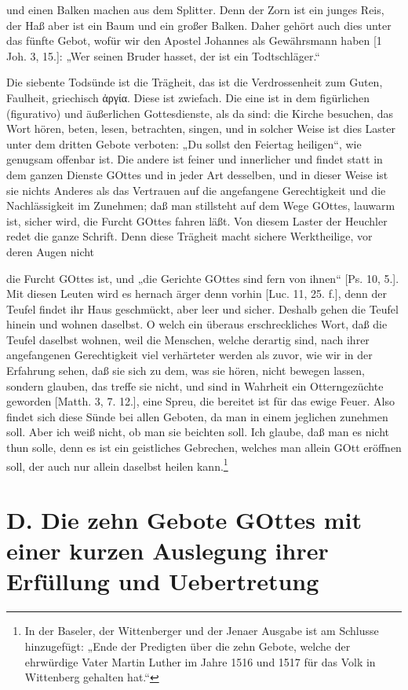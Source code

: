 und einen Balken machen aus dem Splitter. Denn der Zorn ist ein junges Reis, der Haß aber ist ein Baum und ein großer Balken. Daher gehört auch dies unter das fünfte Gebot, wofür wir den Apostel Johannes als Gewährsmann haben [1 Joh. 3, 15.]: „Wer seinen Bruder hasset, der ist ein Todtschläger.“

Die siebente Todsünde ist die Trägheit, das ist die Verdrossenheit zum Guten, Faulheit, griechisch ἀργία. Diese ist zwiefach. Die eine ist in dem figürlichen (figurativo) und äußerlichen Gottesdienste, als da sind: die Kirche besuchen, das Wort hören, beten, lesen, betrachten, singen, und in solcher Weise ist dies Laster unter dem dritten Gebote verboten: „Du sollst den Feiertag heiligen“, wie genugsam offenbar ist. Die andere ist feiner und innerlicher und findet statt in dem ganzen Dienste GOttes und in jeder Art desselben, und in dieser Weise ist sie nichts Anderes als das Vertrauen auf die angefangene Gerechtigkeit und die Nachlässigkeit im Zunehmen; daß man stillsteht auf dem Wege GOttes, lauwarm ist, sicher wird, die Furcht GOttes fahren läßt. Von diesem Laster der Heuchler redet die ganze Schrift. Denn diese Trägheit macht sichere Werktheilige, vor deren Augen nicht

die Furcht GOttes ist, und „die Gerichte GOttes sind fern von ihnen“ [Ps. 10, 5.]. Mit diesen Leuten wird es hernach ärger denn vorhin [Luc. 11, 25. f.], denn der Teufel findet ihr Haus geschmückt, aber leer und sicher. Deshalb gehen die Teufel hinein und wohnen daselbst. O welch ein überaus erschreckliches Wort, daß die Teufel daselbst wohnen, weil die Menschen, welche derartig sind, nach ihrer angefangenen Gerechtigkeit viel verhärteter werden als zuvor, wie wir in der Erfahrung sehen, daß sie sich zu dem, was sie hören, nicht bewegen lassen, sondern glauben, das treffe sie nicht, und sind in Wahrheit ein Otterngezüchte geworden [Matth. 3, 7. 12.], eine Spreu, die bereitet ist für das ewige Feuer. Also findet sich diese Sünde bei allen Geboten, da man in einem jeglichen zunehmen soll. Aber ich weiß nicht, ob man sie beichten soll. Ich glaube, daß man es nicht thun solle, denn es ist ein geistliches Gebrechen, welches man allein GOtt eröffnen soll, der auch nur allein daselbst heilen kann.\footnote{In der Baseler, der Wittenberger und der Jenaer Ausgabe ist am Schlusse hinzugefügt: „Ende der Predigten über die zehn Gebote, welche der ehrwürdige Vater Martin Luther im Jahre 1516 und 1517 für das Volk in Wittenberg gehalten hat.“}

\chapter[D. Die zehn Gebote GOttes mit einer kurzen Auslegung]{D. Die zehn Gebote GOttes mit einer kurzen Auslegung ihrer Erfüllung und Uebertretung}

